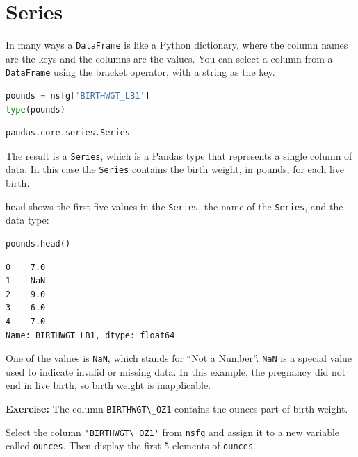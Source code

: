 \hypertarget{series}{%
\section{Series}\label{series}}

In many ways a \passthrough{\lstinline!DataFrame!} is like a Python
dictionary, where the column names are the keys and the columns are the
values. You can select a column from a
\passthrough{\lstinline!DataFrame!} using the bracket operator, with a
string as the key.

\begin{lstlisting}[language=Python,style=source]
pounds = nsfg['BIRTHWGT_LB1']
type(pounds)
\end{lstlisting}

\begin{lstlisting}[style=output]
pandas.core.series.Series
\end{lstlisting}

The result is a \passthrough{\lstinline!Series!}, which is a Pandas type
that represents a single column of data. In this case the
\passthrough{\lstinline!Series!} contains the birth weight, in pounds,
for each live birth.

\passthrough{\lstinline!head!} shows the first five values in the
\passthrough{\lstinline!Series!}, the name of the
\passthrough{\lstinline!Series!}, and the data type:

\begin{lstlisting}[language=Python,style=source]
pounds.head()
\end{lstlisting}

\begin{lstlisting}[style=output]
0    7.0
1    NaN
2    9.0
3    6.0
4    7.0
Name: BIRTHWGT_LB1, dtype: float64
\end{lstlisting}

One of the values is \passthrough{\lstinline!NaN!}, which stands for
``Not a Number''. \passthrough{\lstinline!NaN!} is a special value used
to indicate invalid or missing data. In this example, the pregnancy did
not end in live birth, so birth weight is inapplicable.

\textbf{Exercise:} The column \passthrough{\lstinline!BIRTHWGT\_OZ1!}
contains the ounces part of birth weight.

Select the column \passthrough{\lstinline!'BIRTHWGT\_OZ1'!} from
\passthrough{\lstinline!nsfg!} and assign it to a new variable called
\passthrough{\lstinline!ounces!}. Then display the first 5 elements of
\passthrough{\lstinline!ounces!}.

